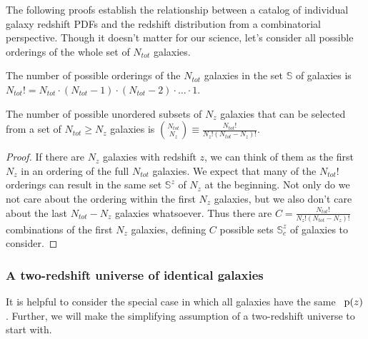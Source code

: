 The following proofs establish the relationship between a catalog of individual galaxy redshift PDFs and the redshift distribution from a combinatorial perspective.
Though it doesn't matter for our science, let's consider all possible orderings of the whole set of $N_{tot}$ galaxies.

\begin{definition}\label{def:permutations}
	The number of possible orderings of the $N_{tot}$ galaxies in the set $\mathbb{S}$ of galaxies is $N_{tot}! = N_{tot} \cdot (N_{tot} - 1) \cdot (N_{tot} - 2) \cdot \dots \cdot 1$.
\end{definition}

\begin{lemma}\label{lem:combinations}
	The number of possible unordered subsets of $N_{z}$ galaxies that can be selected from a set of $N_{tot} \geq N_{z}$ galaxies is $\binom{N_{tot}}{N_{z}} \equiv \frac{N_{tot}!}{N_{z}! (N_{tot} - N_{z})!}$.
\end{lemma}
\begin{proof}
	If there are $N_{z}$ galaxies with redshift $z$, we can think of them as the first $N_{z}$ in an ordering of the full $N_{tot}$ galaxies.
	We expect that many of the $N_{tot}!$ orderings can result in the same set $\mathbb{S}^{z}$ of $N_{z}$ at the beginning.
	Not only do we not care about the ordering within the first $N_{z}$ galaxies, but we also don't care about the last $N_{tot} - N_{z}$ galaxies whatsoever.
	Thus there are $C = \frac{N_{tot}!}{N_{z}! (N_{tot} - N_{z})!}$ combinations of the first $N_{z}$ galaxies, defining $C$ possible sets $\mathbb{S}^{z}_{c}$ of galaxies to consider.
\end{proof}


\subsubsection{A two-redshift universe of identical galaxies}

It is helpful to consider the special case in which all galaxies have the same \pzpdf\ $\mathrm{p}(z)$.
Further, we will make the simplifying assumption of a two-redshift universe to start with.

